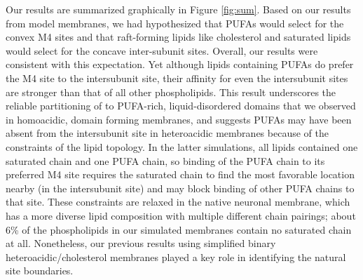 Our results are summarized graphically in Figure \ref{fig:sum}. Based on our results from model membranes, we had hypothesized that
 PUFAs would select for the convex M4 sites and that raft-forming lipids like cholesterol and saturated lipids would select for the concave inter-subunit sites. Overall, our results were consistent with this expectation.  Yet although lipids containing PUFAs do prefer the M4 site to the intersubunit site, their affinity for even the intersubunit sites are stronger than that of all other phospholipids. This result underscores the reliable partitioning of \nachr{} to PUFA-rich, liquid-disordered domains that we observed in homoacidic, domain forming membranes\cite{Sharp2019}, and suggests PUFAs may have been absent from the intersubunit site in heteroacidic membranes\cite{Woods2019} because of the constraints of the lipid topology. In the latter simulations, all lipids contained one saturated chain and one PUFA chain, so binding of the PUFA chain to its preferred M4 site requires the saturated chain to find the most favorable location nearby (in the intersubunit site) and may block binding of other PUFA chains to that site.  These constraints are relaxed in the native neuronal membrane, which has a more diverse lipid composition with multiple different chain pairings; about 6\% of the phospholipids in our simulated membranes contain no saturated chain at all. Nonetheless, our previous results\cite{Woods2019} using simplified binary heteroacidic/cholesterol membranes played a key role in identifying the natural site boundaries.  

